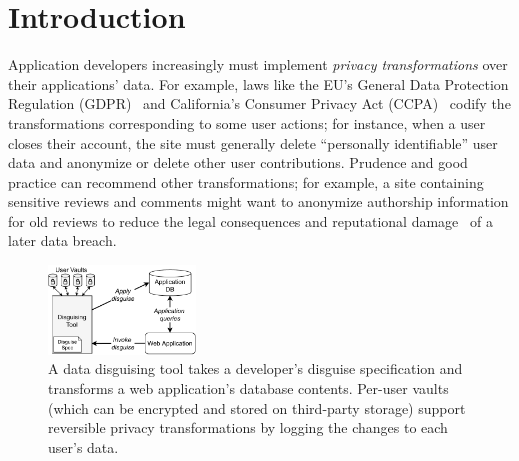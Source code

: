 \section{Introduction}

Application developers increasingly must implement
\emph{privacy transformations} over their applications' data.
%
%
For example, laws like the EU's General Data Protection Regulation (GDPR)~\cite{eu:gdpr} and California's
Consumer Privacy Act (CCPA)~\cite{ca:privacy-act}
codify the transformations corresponding to some user actions; for instance, when a user
closes their account, the site must generally
%
delete “personally identifiable” user data and anonymize or delete other user
contributions.
%
Prudence and good practice can recommend other transformations; for example, a
site containing sensitive reviews and comments might want to anonymize
authorship information for old reviews to reduce the legal consequences and
reputational damage~\cite{breach:amazon,
breach:twitter, breach:fb, breach:marriott, breach:quora}  of a later data breach.


%
%

\begin{figure}[t]
    \centering
    \includegraphics[width=0.35\textwidth]{img/disguise_tool}
    \caption{A data disguising tool takes a developer's disguise specification and transforms
	     a web application's database contents. Per-user vaults
	     (which can be encrypted and stored on third-party storage) support reversible
	     privacy transformations by logging the changes to each user's data.}
    \label{fig:tool}
\end{figure}

